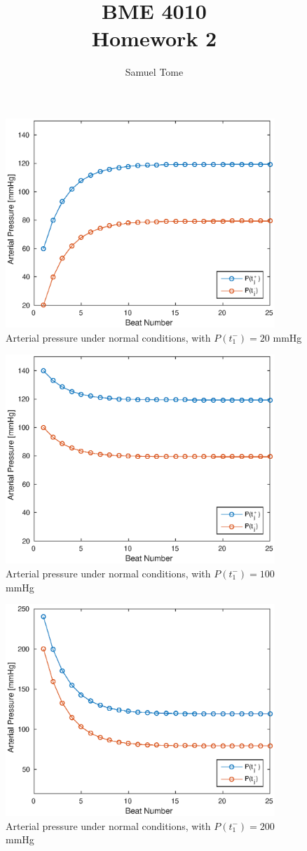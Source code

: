 \documentclass{article}
\title{\huge BME 4010 \\ Homework 2}
\author{Samuel Tome}
\begin{document}
\maketitle
\captionsetup{width=1 \linewidth}


\begin{figure}[H]
\centering
\includegraphics[width=4in]{figures/P_init20.eps}
\caption{Arterial pressure under normal conditions, with $P(t_1^-) = 20$ mmHg}
\end{figure}


\begin{figure}[H]
\centering
\includegraphics[width=4in]{figures/P_init100.eps}
\caption{Arterial pressure under normal conditions, with $P(t_1^-) = 100$ mmHg}
\end{figure}


\begin{figure}[H]
\centering
\includegraphics[width=4in]{figures/P_init200.eps}
\caption{Arterial pressure under normal conditions, with $P(t_1^-) = 200$ mmHg}
\end{figure}
\end{document}
